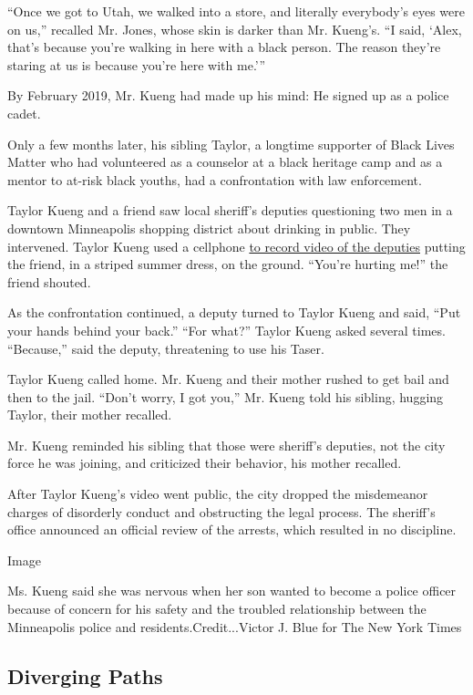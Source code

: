 ``Once we got to Utah, we walked into a store, and literally everybody's
eyes were on us,'' recalled Mr. Jones, whose skin is darker than Mr.
Kueng's. ``I said, `Alex, that's because you're walking in here with a
black person. The reason they're staring at us is because you're here
with me.'''

By February 2019, Mr. Kueng had made up his mind: He signed up as a
police cadet.

Only a few months later, his sibling Taylor, a longtime supporter of
Black Lives Matter who had volunteered as a counselor at a black
heritage camp and as a mentor to at-risk black youths, had a
confrontation with law enforcement.

Taylor Kueng and a friend saw local sheriff's deputies questioning two
men in a downtown Minneapolis shopping district about drinking in
public. They intervened. Taylor Kueng used a cellphone
\href{https://kstp.com/news/naacp-hennepin-county-sheriff-investigate-arrest-caught-on-video-tape/5390358/}{to
record video of the deputies} putting the friend, in a striped summer
dress, on the ground. ``You're hurting me!'' the friend shouted.

As the confrontation continued, a deputy turned to Taylor Kueng and
said, ``Put your hands behind your back.'' ``For what?'' Taylor Kueng
asked several times. ``Because,'' said the deputy, threatening to use
his Taser.

Taylor Kueng called home. Mr. Kueng and their mother rushed to get bail
and then to the jail. ``Don't worry, I got you,'' Mr. Kueng told his
sibling, hugging Taylor, their mother recalled.

Mr. Kueng reminded his sibling that those were sheriff's deputies, not
the city force he was joining, and criticized their behavior, his mother
recalled.

After Taylor Kueng's video went public, the city dropped the misdemeanor
charges of disorderly conduct and obstructing the legal process. The
sheriff's office announced an official review of the arrests, which
resulted in no discipline.

Image

Ms. Kueng said she was nervous when her son wanted to become a police
officer because of concern for his safety and the troubled relationship
between the Minneapolis police and residents.Credit...Victor J. Blue for
The New York Times

\hypertarget{diverging-paths}{%
\subsection{Diverging Paths}\label{diverging-paths}}

